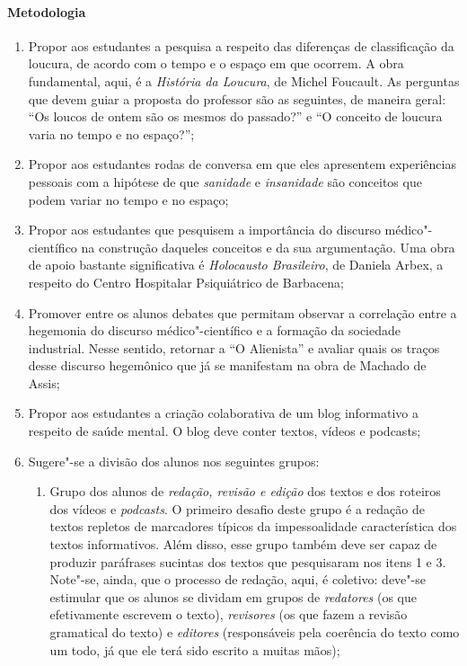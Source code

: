 \documentclass{extarticle}
\begin{document}
\paragraph{Metodologia}
\begin{enumerate}
\item Propor aos estudantes a pesquisa a respeito das diferenças de
classificação da loucura, de acordo com o tempo e o espaço em que
ocorrem. A obra fundamental, aqui, é a \emph{História da Loucura}, de
Michel Foucault. As perguntas que devem guiar a proposta do professor
são as seguintes, de maneira geral: ``Os loucos de ontem são os mesmos
do passado?'' e ``O conceito de loucura varia no tempo e no espaço?'';

\item Propor aos estudantes rodas de conversa em que eles apresentem
experiências pessoais com a hipótese de que \emph{sanidade} e
\emph{insanidade} são conceitos que podem variar no tempo e no espaço;

\item Propor aos estudantes que pesquisem a importância do discurso
médico"-científico na construção daqueles conceitos e da sua
argumentação. Uma obra de apoio bastante significativa é
\emph{Holocausto Brasileiro}, de Daniela Arbex, a respeito do Centro
Hospitalar Psiquiátrico de Barbacena;

\item Promover entre os alunos debates que permitam observar a correlação
entre a hegemonia do discurso médico"-científico e a formação da
sociedade industrial. Nesse sentido, retornar a ``O Alienista'' e
avaliar quais os traços desse discurso hegemônico que já se manifestam
na obra de Machado de Assis;

\item Propor aos estudantes a criação colaborativa de um blog informativo a
respeito de saúde mental. O blog deve conter textos, vídeos e podcasts;

\item Sugere"-se a divisão dos alunos nos seguintes grupos:

\begin{enumerate}
\item Grupo dos alunos de \emph{redação, revisão e edição} dos textos e dos
roteiros dos vídeos e \textit{podcasts}. O primeiro desafio deste grupo é a
redação de textos repletos de marcadores típicos da impessoalidade
característica dos textos informativos. Além disso, esse grupo também
deve ser capaz de produzir paráfrases sucintas dos textos que
pesquisaram nos itens 1 e 3. Note"-se, ainda, que o processo de redação,
aqui, é coletivo: deve"-se estimular que os alunos se dividam em grupos
de \emph{redatores} (os que efetivamente escrevem o texto),
\emph{revisores} (os que fazem a revisão gramatical do texto) e
\emph{editores} (responsáveis pela coerência do texto como um todo, já
que ele terá sido escrito a muitas mãos);


\end{enumerate}
\end{enumerate}
\end{document}
